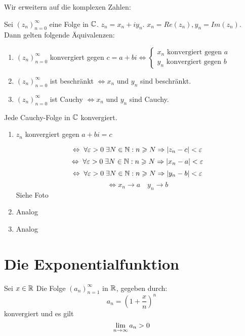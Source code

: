 \documentclass[main.tex]{subfiles}
\begin{document}
Wir erweitern auf die komplexen Zahlen:
\begin{Theorem}
  Sei $(z_n)_{n=0}^\infty$ eine Folge in $\mathbb{C}$. $z_n = x_n + i y_n$. $x_n = Re(z_n), y_n = Im(z_n)$. Dann gelten folgende Äquivalenzen:
  \begin{enumerate}
    \item $(z_n)_{n=0}^\infty$ konvergiert gegen $c = a + bi \Leftrightarrow \left\{\begin{aligned}
      x_n \text{ konvergiert gegen } a\\
      y_n \text{ konvergiert gegen } b
    \end{aligned}\right.$
    \item $(z_n)_{n=0}^\infty$ ist beschränkt $\Leftrightarrow x_n$ und $y_n$ sind beschränkt.
    \item $(z_n)_{n=0}^\infty$ ist Cauchy $\Leftrightarrow x_n$ und $y_n$ sind Cauchy.
  \end{enumerate}
\end{Theorem}

\begin{Korollar}
  Jede Cauchy-Folge in $\mathbb{C}$ konvergiert.
\end{Korollar}

\begin{Beweis}[Theorem]
  \begin{enumerate}
    \item $z_n$ konvergiert gegen $a + bi = c$

      $$\Leftrightarrow \;\forall \varepsilon >0 \;\exists N \in \mathbb{N} : n \geqslant N \Rightarrow |z_n - c| < \varepsilon$$
      $$\Leftrightarrow \;\forall \varepsilon >0 \;\exists N \in \mathbb{N} : n \geqslant N \Rightarrow |x_n -a| < \varepsilon$$
      $$\Leftrightarrow \;\forall \varepsilon >0 \;\exists N \in \mathbb{N} : n \geqslant N \Rightarrow |y_n - b| < \varepsilon$$
      $$\Leftrightarrow x_n \to a \quad y_n \to b$$
      Siehe Foto
    \item Analog
    \item Analog
  \end{enumerate}
\end{Beweis}


\section{Die Exponentialfunktion}

\begin{Theorem}
  Sei $x \in \mathbb{R}$ Die Folge $(a_n)_{n=1}^\infty$ in $\mathbb{R}$, gegeben durch:
  $$a_n = (1+\dfrac{x}{n})^n$$
  konvergiert und es gilt
  $$\lim \limits_{n \to \infty} a_n > 0$$
\end{Theorem}
\end{document}
